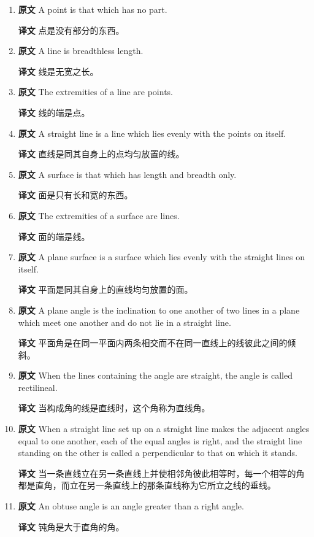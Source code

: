 \documentclass[UTF8,zihao=-4]{ctexart}
\begin{document}
\begin{enumerate}
\item \textbf{原文} A point is that which has no part. \par\textbf{译文} 点是没有部分的东西。
\item \textbf{原文} A line is breadthless length. \par\textbf{译文} 线是无宽之长。
\item \textbf{原文} The extremities of a line are points. \par\textbf{译文} 线的端是点。
\item \textbf{原文} A straight line is a line which lies evenly with the points on itself. \par\textbf{译文} 直线是同其自身上的点均匀放置的线。
\item \textbf{原文} A surface is that which has length and breadth only. \par\textbf{译文} 面是只有长和宽的东西。
\item \textbf{原文} The extremities of a surface are lines. \par\textbf{译文} 面的端是线。
\item \textbf{原文} A plane surface is a surface which lies evenly with the straight lines on itself. \par\textbf{译文} 平面是同其自身上的直线均匀放置的面。
\item \textbf{原文} A plane angle is the inclination to one another of two lines in a plane which meet one another and do not lie in a straight line. \par\textbf{译文} 平面角是在同一平面内两条相交而不在同一直线上的线彼此之间的倾斜。
\item \textbf{原文} When the lines containing the angle are straight, the angle is called rectilineal. \par\textbf{译文} 当构成角的线是直线时，这个角称为直线角。
\item \textbf{原文} When a straight line set up on a straight line makes the adjacent angles equal to one another, each of the equal angles is right, and the straight line standing on the other is called a perpendicular to that on which it stands. \par\textbf{译文} 当一条直线立在另一条直线上并使相邻角彼此相等时，每一个相等的角都是直角，而立在另一条直线上的那条直线称为它所立之线的垂线。
\item \textbf{原文} An obtuse angle is an angle greater than a right angle. \par\textbf{译文} 钝角是大于直角的角。

\end{enumerate}
\end{document}
